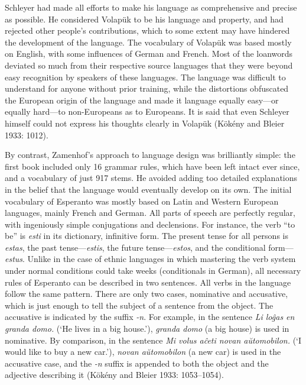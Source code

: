 Schleyer had made all efforts to make his language as comprehensive and precise as possible.
He considered Volapük to be his language and property, and had rejected other people's contributions, which to some extent may have hindered the development of the language.
The vocabulary of Volapük was based mostly on English, with some influences of German and French.
Most of the loanwords deviated so much from their respective source languages that they were beyond easy recognition by speakers of these languages.
The language was difficult to understand for anyone without prior training, while the distortions obfuscated the European origin of the language and made it language equally easy---or equally hard---to non-Europeans as to Europeans.
It is said that even Schleyer himself could not express his thoughts clearly in Volapük
(Kökény and Bleier 1933: 1012).

By contrast, Zamenhof's approach to language design was brilliantly simple: the first book included only 16 grammar rules, which have been left intact ever since, and a vocabulary of just 917 stems.
He avoided adding too detailed explanations in the belief that the language would eventually develop on its own.
The initial vocabulary of Esperanto was mostly based on Latin and Western European languages, mainly French and German.
All parts of speech are perfectly regular, with ingeniously simple conjugations and declensions.
For instance, the verb ``to be'' is \textit{esti} in its dictionary, infinitive form.
The present tense for all persons is \textit{estas}, the past tense---\textit{estis}, the future tense---\textit{estos}, and the conditional form---\textit{estus}.
Unlike in the case of ethnic languages in which mastering the verb system under normal conditions could take weeks (conditionals in German), all necessary rules of Esperanto can be described in two sentences.
All verbs in the language follow the same pattern.
There are only two cases, nominative and accusative, which is just enough to tell the subject of a sentence from the object.
The accusative is indicated by the suffix \textit{-n}.
For example, in the sentence \textit{Li loĝas en granda domo.} (`He lives in a big house.'), \textit{granda domo} (a big house) is used in nominative.
By comparison, in the sentence \textit{Mi volus aĉeti novan aŭtomobilon.} (`I would like to buy a new car.'), \textit{novan aŭtomobilon} (a new car) is used in the accusative case, and the \textit{-n} suffix is appended to both the object and the adjective describing it
(Kökény and Bleier 1933: 1053--1054).


